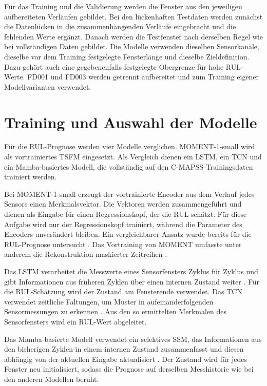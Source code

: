 \begin{samepage}
Für das Training und die Validierung werden die Fenster aus den jeweiligen aufbereiteten Verläufen gebildet. Bei den lückenhaften Testdaten werden zunächst die Datenlücken in die zusammenhängenden Verläufe eingebracht und die fehlenden Werte ergänzt. Danach werden die Testfenster nach derselben Regel wie bei vollständigen Daten gebildet. Die Modelle verwenden dieselben Sensorkanäle, dieselbe vor dem Training festgelegte Fensterlänge und dieselbe Zieldefinition. Dazu gehört auch eine gegebenenfalls festgelegte Obergrenze für hohe \ac{RUL}-Werte. FD001 und FD003 werden getrennt aufbereitet und zum Training eigener Modellvarianten verwendet.
\par
\end{samepage}

\section{Training und Auswahl der Modelle}

Für die \ac{RUL}-Prognose werden vier Modelle verglichen. MOMENT-1-small wird als vortrainiertes \ac{TSFM} eingesetzt. Als Vergleich dienen ein \ac{LSTM}, ein \ac{TCN} und ein Mamba-basiertes Modell, die vollständig auf den C-MAPSS-Trainingsdaten trainiert werden.

Bei MOMENT-1-small erzeugt der vortrainierte Encoder aus dem Verlauf jedes Sensors einen Merkmalsvektor. Die Vektoren werden zusammengeführt und dienen als Eingabe für einen Regressionskopf, der die \ac{RUL} schätzt. Für diese Aufgabe wird nur der Regressionskopf trainiert, während die Parameter des Encoders unverändert bleiben. Ein vergleichbarer Ansatz wurde bereits für die \ac{RUL}-Prognose untersucht \parencite[246]{dintenUsingTimeSeries2025}. Das Vortraining von MOMENT umfasste unter anderem die Rekonstruktion maskierter Zeitreihen \parencite[3--4]{goswamiMOMENTFamilyOpen2024}.

Das \ac{LSTM} verarbeitet die Messwerte eines Sensorfensters Zyklus für Zyklus und gibt Informationen aus früheren Zyklen über einen internen Zustand weiter \parencite[5]{zhangLSTMBasedMultiTaskMethod2023}. Für die \ac{RUL}-Schätzung wird der Zustand am Fensterende verwendet. Das \ac{TCN} verwendet zeitliche Faltungen, um Muster in aufeinanderfolgenden Sensormessungen zu erkennen \parencite[3--4]{wangRemainingUsefulLife2020}. Aus den so ermittelten Merkmalen des Sensorfensters wird ein \ac{RUL}-Wert abgeleitet.

Das Mamba-basierte Modell verwendet ein selektives \ac{SSM}, das Informationen aus den bisherigen Zyklen in einem internen Zustand zusammenfasst und diesen abhängig von der aktuellen Eingabe aktualisiert \parencite[Abschn.~3]{guMambaLinearTimeSequence2024}. Der Zustand wird für jedes Fenster neu initialisiert, sodass die Prognose auf derselben Messhistorie wie bei den anderen Modellen beruht.

